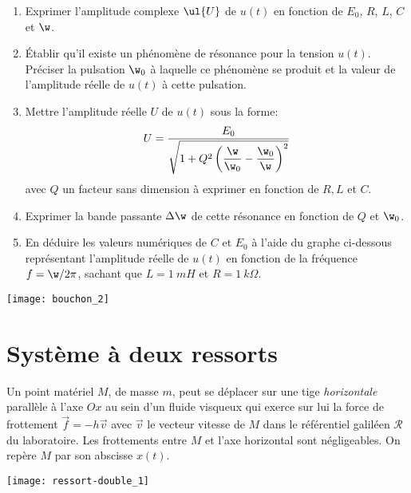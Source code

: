 \documentclass[a4paper, 12pt, final, garamond]{book}
\begin{document}
\begin{enumerate}
    \item Exprimer l'amplitude complexe $\ul{U}$ de $u(t)$ en
        fonction de $E_0$, $R$, $L$, $C$ et $\w$.
    \item Établir qu'il existe un phénomène de résonance pour la tension
        $u(t)$. Préciser la pulsation $\w_0$ à laquelle ce phénomène se
        produit et la valeur de l'amplitude réelle de $u(t)$ à cette
        pulsation.
    \item Mettre l'amplitude réelle $U$ de $u(t)$ sous la forme: \[U =
            \dfrac{E_0}{\sqrt{1 + Q^2\left(\dfrac{\w}{\w_0} -
        \dfrac{\w_0}{\w}\right)^2}}\] avec $Q$ un facteur sans
        dimension à exprimer en fonction de $R,L$ et $C$.
    \item Exprimer la bande passante $\Delta\w$ de cette résonance en
        fonction de $Q$ et $\w_0$.
    \item En déduire les valeurs numériques de $C$ et $E_0$ à l'aide du
        graphe ci-dessous représentant l'amplitude réelle de $u(t)$ en
        fonction de la fréquence $f=\w/2\pi$, sachant que $L= \SI{1}{mH}$ et
        $R= \SI{1}{k\Omega}$.
\end{enumerate}

\begin{center}
    \texttt{[image: bouchon\_2]}
\end{center}

\section{Système à deux ressorts}
\begin{minipage}{0.60\linewidth}
    Un point matériel $M$, de masse $m$, peut se déplacer sur une tige
    \emph{horizontale} parallèle à l'axe $Ox$ au sein d'un fluide visqueux qui
    exerce sur lui la force de frottement $\vec{f} = - h\vec{v}$ avec
    $\vec{v}$ le vecteur vitesse de $M$ dans le référentiel galiléen
    $\mathcal{R}$ du laboratoire. Les frottements entre $M$ et l'axe
    horizontal sont négligeables. On repère $M$ par son abscisse $x(t)$.
\end{minipage}
\hfill
\begin{minipage}{0.35\linewidth}
    \begin{center}
        \texttt{[image: ressort-double\_1]}
    \end{center}
\end{minipage}
\end{document}
